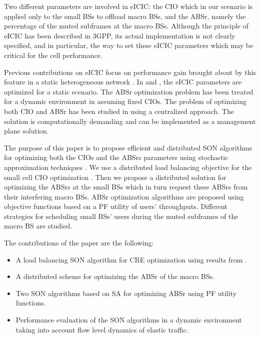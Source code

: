 \documentclass[conference]{IEEEtran}
\begin{document}
Two different parameters are involved in \ac{eICIC}: the \ac{CIO} which in our scenario is applied only to the small \acp{BS} to offload macro BSs, and the \ac{ABSr}, namely the percentage of the muted subframes at the macro BSs. Although the principle of eICIC has been described in 3GPP, its actual implementation is not clearly specified, and in particular, the way to set these eICIC parameters which may be critical for the cell performance.

Previous contributions on eICIC focus on performance gain brought about by this feature in a static heterogeneous network \cite{wang2012performance,pedersen2012eicic,shirakabe2011performance}. In \cite{pang2012optimized} and \cite{bedekar2013optimal}, the \ac{eICIC} parameters are optimized for a static scenario. The \ac{ABSr} optimization problem has been treated for a dynamic environment in \cite{vasudevandynamic} assuming fixed \acp{CIO}. The problem of optimizing both \ac{CIO} and \ac{ABSr} has been studied in \cite{deb2013algorithms,yasireICIC} using a centralized approach. The solution is computationally demanding and can be implemented as a management plane solution.
	
The purpose of this paper is to propose efficient and distributed \ac{SON} algorithms for optimizing both the \acp{CIO} and the \acp{ABSr} parameters using stochastic approximation techniques \cite{Kushner,Borkar}.
We use a distributed load balancing objective for the small cell \ac{CIO} optimization \cite{CombesInfocom2012}. 
Then we propose a distributed solution for optimizing the \acp{ABSr} at the small \acp{BS} which in turn request these \acp{ABSr} from their interfering macro \acp{BS}. \ac{ABSr} optimization algorithms are proposed using objective functions based on a \ac{PF} utility of users' throughputs. Different strategies for scheduling small \acp{BS}' users during the muted subframes of the macro \ac{BS} are studied.

	
	The contributions of the paper are the following:
	\begin{itemize}
	\item A load balancing \ac{SON} algorithm for \ac{CRE} optimization using results from \cite{CombesInfocom2012}. 
	\item A distributed scheme for optimizing the \ac{ABSr} of the macro \acp{BS}.
	\item Two \ac{SON} algorithms based on \ac{SA} for optimizing \ac{ABSr} using \ac{PF} utility functions.
	\item Performance evaluation of the SON algorithms in a dynamic environment taking into account flow level dynamics of elastic traffic.
	\end{itemize}
\end{document}
